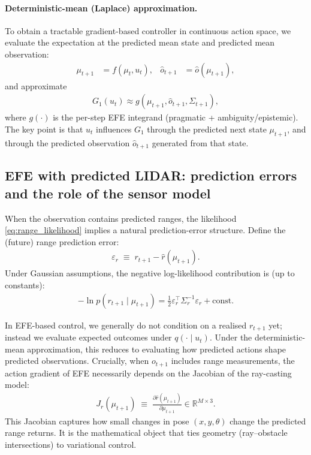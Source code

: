\documentclass[a4paper, twoside]{article}
\begin{document}
\paragraph{Deterministic-mean (Laplace) approximation.}
To obtain a tractable gradient-based controller in continuous action space, we evaluate the expectation at the predicted mean state and predicted mean observation:
\begin{align}
\mu_{t+1} &= f(\mu_t, u_t),
&
\hat o_{t+1} &= \hat o(\mu_{t+1}),
\label{eq:mean_prediction}
\end{align}
and approximate
\begin{align}
G_1(u_t)
\approx
g(\mu_{t+1}, \hat o_{t+1}, \Sigma_{t+1}),
\label{eq:efe_one_step_mean_approx}
\end{align}
where $g(\cdot)$ is the per-step EFE integrand (pragmatic + ambiguity/epistemic). The key point is that $u_t$ influences $G_1$ through the predicted next state $\mu_{t+1}$, and through the predicted observation $\hat o_{t+1}$ generated from that state.

\subsection{EFE with predicted LIDAR: prediction errors and the role of the sensor model}
\label{sec:53_lidar_in_efe}

When the observation contains predicted ranges, the likelihood \eqref{eq:range_likelihood} implies a natural prediction-error structure. Define the (future) range prediction error:
\begin{align}
\varepsilon_{r}
\;\equiv\;
r_{t+1} - \hat r(\mu_{t+1}).
\label{eq:range_prediction_error}
\end{align}
Under Gaussian assumptions, the negative log-likelihood contribution is (up to constants):
\begin{align}
-\ln p(r_{t+1}\mid \mu_{t+1})
=
\frac{1}{2}\varepsilon_r^\top \Sigma_r^{-1}\varepsilon_r + \text{const}.
\label{eq:range_nll}
\end{align}

In EFE-based control, we generally do not condition on a realised $r_{t+1}$ yet; instead we evaluate expected outcomes under $q(\cdot\mid u_t)$. Under the deterministic-mean approximation, this reduces to evaluating how predicted actions shape predicted observations. Crucially, when $o_{t+1}$ includes range measurements, the action gradient of EFE necessarily depends on the Jacobian of the ray-casting model:
\begin{align}
J_r(\mu_{t+1}) \;\equiv\; \frac{\partial \hat r(\mu_{t+1})}{\partial \mu_{t+1}}
\in \mathbb{R}^{M\times 3}.
\label{eq:lidar_jacobian_def}
\end{align}
This Jacobian captures how small changes in pose $(x,y,\theta)$ change the predicted range returns. It is the mathematical object that ties geometry (ray--obstacle intersections) to variational control.
\end{document}
